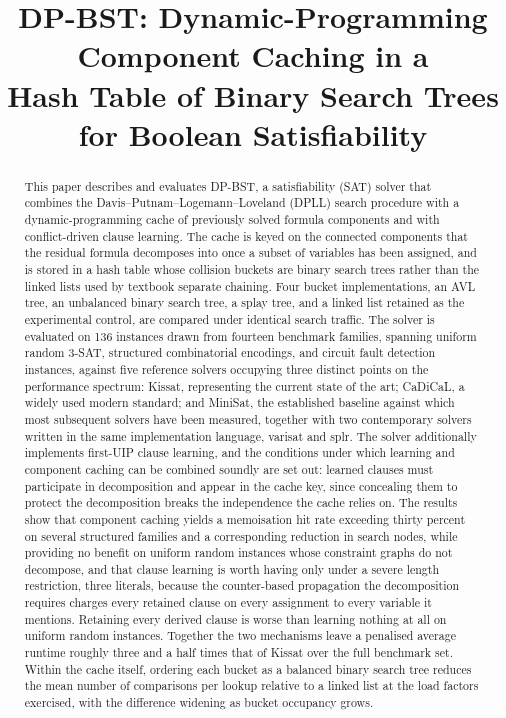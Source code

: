 \documentclass[conference]{IEEEtran}
\begin{document}
\title{DP-BST: Dynamic-Programming Component Caching in a\\
Hash Table of Binary Search Trees for Boolean Satisfiability}

\author{
}

\maketitle

\begin{abstract}
This paper describes and evaluates DP-BST, a satisfiability (SAT) solver that combines the
Davis--Putnam--Logemann--Loveland (DPLL) search procedure with a dynamic-programming cache of
previously solved formula components and with conflict-driven clause learning. The cache is keyed on the connected components that the
residual formula decomposes into once a subset of variables has been assigned, and is stored in a
hash table whose collision buckets are binary search trees rather than the linked lists used by
textbook separate chaining. Four bucket implementations, an AVL tree, an unbalanced binary search
tree, a splay tree, and a linked list retained as the experimental control, are compared under
identical search traffic. The solver is evaluated on 136 instances drawn from fourteen benchmark
families, spanning uniform random 3-SAT, structured combinatorial encodings, and circuit fault
detection instances, against five reference solvers occupying three distinct points on the
performance spectrum: Kissat, representing the current state of the art; CaDiCaL, a widely used
modern standard; and MiniSat, the established baseline against which most subsequent solvers have
been measured, together with two contemporary solvers written in the same implementation
language, varisat and splr. The solver additionally implements first-UIP clause learning, and the
conditions under which learning and component caching can be combined soundly are set out: learned
clauses must participate in decomposition and appear in the cache key, since concealing them to
protect the decomposition breaks the independence the cache relies on. The results show that
component caching yields a memoisation hit rate exceeding thirty percent on several structured
families and a corresponding reduction in search nodes, while providing no benefit on uniform
random instances whose constraint graphs do not decompose, and that clause learning is worth
having only under a severe length restriction, three literals, because the counter-based
propagation the decomposition requires charges every retained clause on every assignment to every
variable it mentions. Retaining every derived clause is worse than learning nothing at all on
uniform random instances. Together the two mechanisms leave a penalised average runtime roughly
three and a half times that of Kissat over the full benchmark set. Within the cache itself,
ordering each bucket as a balanced binary search tree reduces the mean number of comparisons per
lookup relative to a linked list at the load factors exercised, with the difference widening as
bucket occupancy grows.
\end{abstract}
\end{document}
